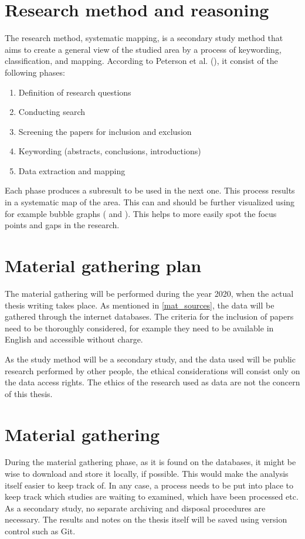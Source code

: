 \documentclass[utf8,english]{gradu3}
\begin{document}
\section{Research method and reasoning}
\label{method}
The research method, systematic mapping, is a secondary study method that aims to create a general view of the studied area by a process of keywording, classification, and mapping. According to Peterson et al. (\cite*{petersen2008}), it consist of the following phases:
\begin{enumerate}
    \item Definition of research questions
    \item Conducting search
    \item Screening the papers for inclusion and exclusion
    \item Keywording (abstracts, conclusions, introductions)
    \item Data extraction and mapping
\end{enumerate}

Each phase produces a subresult to be used in the next one. This process results in a systematic map of the area. This can and should be further visualized using for example bubble graphs (\cite{mononen2018} and \cite{petersen2008}). This helps to more easily spot the focus points and gaps in the research.

\section{Material gathering plan}
The material gathering will be performed during the year 2020, when the actual thesis writing takes place. As mentioned in \ref{mat_sources}, the data will be gathered through the internet databases. The criteria for the inclusion of papers need to be thoroughly considered, for example they need to be available in English and accessible without charge.

As the study method will be a secondary study, and the data used will be public research performed by other people, the ethical considerations will consist only on the data access rights. The ethics of the research used as data are not the concern of this thesis.

\section{Material gathering}
During the material gathering phase, as it is found on the databases, it might be wise to download and store it locally, if possible. This would make the analysis itself easier to keep track of. In any case, a process needs to be put into place to keep track which studies are waiting to examined, which have been processed etc.
As a secondary study, no separate archiving and disposal procedures are necessary. The results and notes on the thesis itself will be saved using version control such as Git.
\end{document}
